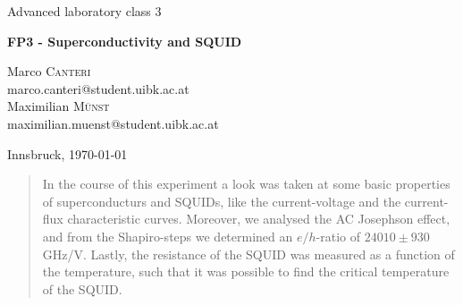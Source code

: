 \documentclass[a4paper,10pt]{article}
\begin{document}
\begin{titlepage}
 \begin{center}
	\Large{Advanced laboratory class 3}
	\end{center}
	\begin{center}
	 \LARGE{\textbf{FP3 - Superconductivity and SQUID}}
	\end{center}
	
	\begin{center}
	
	\large Marco \textsc{Canteri} \\
	marco.canteri@student.uibk.ac.at\\
	\large Maximilian \textsc{Münst} \\
	maximilian.muenst@student.uibk.ac.at
	\end{center}
	
	\begin{center}
	\vspace{1cm}
	Innsbruck, \today
	\vspace{1cm}
	\end{center}
	
	\begin{abstract}
    In the course of this experiment a look was taken at some basic properties of superconducturs and SQUIDs, like the current-voltage and the current-flux characteristic curves. Moreover, we analysed the AC Josephson effect, and from the Shapiro-steps we determined an $e/h$-ratio of $24010 \pm 930$ GHz/V. Lastly, the resistance of the SQUID was measured as a function of the temperature, such that it was possible to find the critical temperature of the SQUID.
    \end{abstract}
    \vspace{1cm}
	

\end{titlepage}
\end{document}
